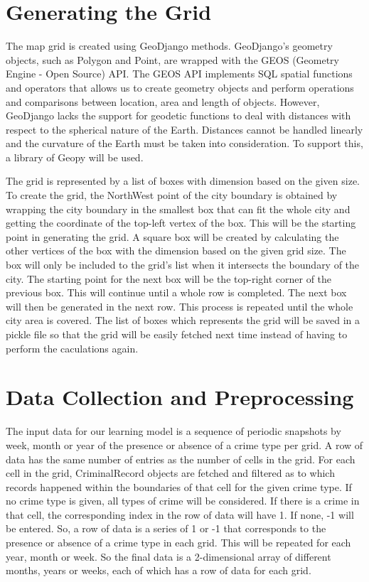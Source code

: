 \section{Generating the Grid}
    The map grid is created using GeoDjango methods. GeoDjango's geometry objects, such as Polygon and Point, are wrapped with the GEOS (Geometry Engine - Open Source) API. The GEOS API implements SQL spatial functions and operators that allows us to create geometry objects and perform operations and comparisons between location, area and length of objects. However, GeoDjango lacks the support for geodetic functions to deal with distances with respect to the spherical nature of the Earth. Distances cannot be handled linearly and the curvature of the Earth must be taken into consideration. To support this, a library of Geopy will be used.

    The grid is represented by a list of boxes with dimension based on the given size. To create the grid, the NorthWest point of the city boundary is obtained by wrapping the city boundary in the smallest box that can fit the whole city and getting the coordinate of the top-left vertex of the box. This will be the starting point in generating the grid. A square box will be created by calculating the other vertices of the box with the dimension based on the given grid size. The box will only be included to the grid's list when it intersects the boundary of the city. The starting point for the next box will be the top-right corner of the previous box. This will continue until a whole row is completed. The next box will then be generated in the next row. This process is repeated until the whole city area is covered. The list of boxes which represents the grid will be saved in a pickle file so that the grid will be easily fetched next time instead of having to perform the caculations again.

\section{Data Collection and Preprocessing}
    The input data for our learning model is a sequence of periodic snapshots by week, month or year of the presence or absence of a crime type per grid. A row of data has the same number of entries as the number of cells in the grid. For each cell in the grid, CriminalRecord objects are fetched and filtered as to which records happened within the boundaries of that cell for the given crime type. If no crime type is given, all types of crime will be considered. If there is a crime in that cell, the corresponding index in the row of data will have 1. If none, -1 will be entered. So, a row of data is a series of 1 or -1 that corresponds to the presence or absence of a crime type in each grid. This will be repeated for each year, month or week. So the final data is a 2-dimensional array of different months, years or weeks, each of which has a row of data for each grid.


